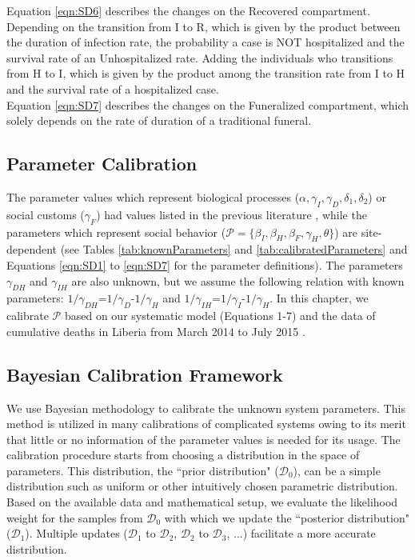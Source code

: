 Equation \ref{eqn:SD6} describes the changes on the Recovered compartment. Depending on the transition from I to R, which is given by the product between the duration of infection rate, the probability a case is NOT hospitalized and the survival rate of an Unhospitalized rate. Adding  the individuals who transitions from H to I, which is given by the product among the transition rate from I to H and the survival rate of a hospitalized case.\\

Equation \ref{eqn:SD7} describes the changes on the Funeralized compartment, which solely depends on the rate of duration of a traditional funeral.\\





\subsection{Parameter Calibration}

The parameter values which represent biological processes ($\alpha, \gamma_{I}, \gamma_{D}, \delta_{1}, \delta_{2}$) or social customs ($\gamma_{F}$) had values listed in the previous literature \cite{Poletto2014, Webb2015}, while the parameters which represent social behavior ($\mathcal{P}=\{\beta_{I}, \beta_{H}, \beta_{F}, \gamma_{H}, \theta\}$) are site-dependent (see Tables \ref{tab:knownParameters} and \ref{tab:calibratedParameters} and Equations \ref{eqn:SD1} to \ref{eqn:SD7} for the parameter definitions). The parameters $\gamma_{DH}$ and $\gamma_{IH}$ are also unknown, but we assume the following relation with known parameters: $1/\gamma_{DH}$=$1/\gamma_{D}$-$1/\gamma_{H}$ and $1/\gamma_{IH}$=$1/\gamma_{I}$-$1/\gamma_{H}$. In this chapter, we calibrate $\mathcal{P}$ based on our systematic model (Equations 1-7) and the data of cumulative deaths in Liberia from March 2014 to July 2015 \cite{CDCData}.


\subsection{Bayesian Calibration Framework}
We use Bayesian methodology to calibrate the unknown system parameters. This method is utilized in many calibrations of complicated systems owing to its merit that little or no information of the parameter values is needed for its usage. The calibration procedure starts from choosing a distribution in the space of parameters. This distribution, the ``prior distribution" ($\mathcal{D}_0$), can be a simple distribution such as uniform or other intuitively chosen parametric distribution. Based on the available data and mathematical setup, we evaluate the likelihood weight for the samples from $\mathcal{D}_0$ with which we update the ``posterior distribution" ($\mathcal{D}_1$). Multiple updates ($\mathcal{D}_1$ to $\mathcal{D}_2$, $\mathcal{D}_2$ to $\mathcal{D}_3$, ...) facilitate a more accurate distribution.

